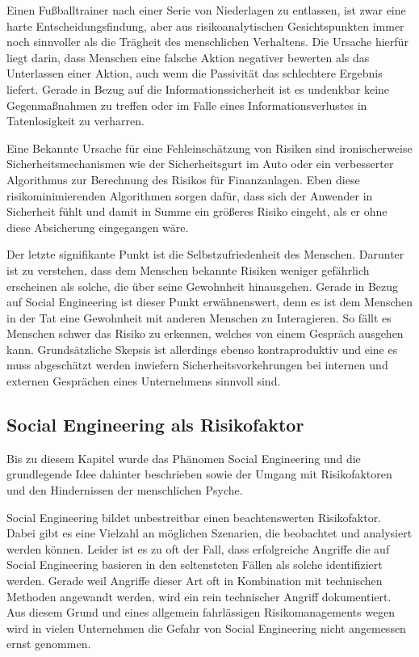 Einen Fußballtrainer nach einer Serie von Niederlagen zu entlassen, ist zwar eine harte
Entscheidungsfindung, aber aus risikoanalytischen Gesichtspunkten immer noch sinnvoller als die
Trägheit des menschlichen Verhaltens.
Die Ursache hierfür liegt darin, dass Menschen eine falsche Aktion negativer bewerten als das
Unterlassen einer Aktion, auch wenn die Passivität das schlechtere Ergebnis liefert.
Gerade in Bezug auf die Informationssicherheit ist es undenkbar keine Gegenmaßnahmen zu treffen oder
im Falle eines Informationsverlustes in Tatenlosigkeit zu verharren.

Eine Bekannte Ursache für eine Fehleinschätzung von Risiken sind ironischerweise
Sicherheitsmechanismen wie der Sicherheitsgurt im Auto oder ein verbesserter Algorithmus zur
Berechnung des Risikos für Finanzanlagen.
Eben diese risikominimierenden Algorithmen sorgen dafür, dass sich der Anwender in Sicherheit fühlt
und damit in Summe ein größeres Risiko eingeht, als er ohne diese Absicherung eingegangen wäre.

Der letzte signifikante Punkt ist die Selbstzufriedenheit des Menschen. Darunter ist zu verstehen,
dass dem Menschen bekannte Risiken weniger gefährlich erscheinen als solche, die über seine Gewohnheit
hinausgehen.
Gerade in Bezug auf Social Engineering ist dieser Punkt erwähnenswert, denn es ist dem Menschen in der
Tat eine Gewohnheit mit anderen Menschen zu Interagieren.
So fällt es Menschen schwer das Risiko zu erkennen, welches von einem Gespräch ausgehen kann.
Grundsätzliche Skepsis ist allerdings ebenso kontraproduktiv und eine es muss abgeschätzt werden
inwiefern Sicherheitsvorkehrungen bei internen und externen Gesprächen eines Unternehmens sinnvoll
sind.
\cite{risikomanagement}

\subsection{Social Engineering als Risikofaktor}\label{sec:social_engineering_als_risikofaktor}
Bis zu diesem Kapitel wurde das Phänomen Social Engineering und die grundlegende Idee dahinter
beschrieben sowie der Umgang mit Risikofaktoren und den Hindernissen der menschlichen Psyche.

Social Engineering bildet unbestreitbar einen beachtenswerten Risikofaktor.
Dabei gibt es eine Vielzahl an möglichen Szenarien, die beobachtet und analysiert werden können.
Leider ist es zu oft der Fall, dass erfolgreiche Angriffe die auf Social Engineering basieren in den
seltensteten Fällen als solche identifiziert werden.
Gerade weil Angriffe dieser Art oft in Kombination mit technischen Methoden angewandt werden, wird ein
rein technischer Angriff dokumentiert.
Aus diesem Grund und eines allgemein fahrlässigen Risikomanagements wegen wird in vielen Unternehmen
die Gefahr von Social Engineering nicht angemessen ernst genommen.